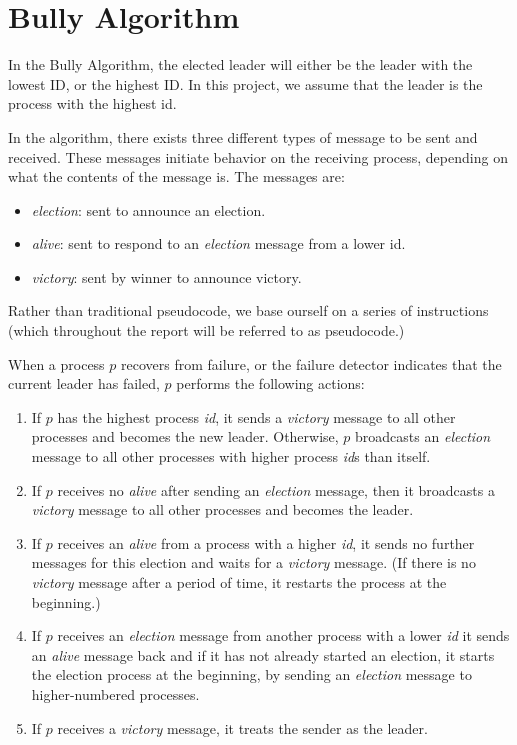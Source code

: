 \documentclass{report}
\begin{document}
\section{Bully Algorithm}

In the Bully Algorithm, the elected leader will either be the leader with the lowest ID, or the highest ID. In this project, we assume that the leader is the process with the highest id.

In the algorithm, there exists three different types of message to be sent and received. These messages initiate behavior on the receiving process, depending on what the contents of the message is. The messages are:
\begin{itemize}
  \item \textit{election}: sent to announce an election.
  \item \textit{alive}: sent to respond to an \textit{election} message from a lower id.
  \item \textit{victory}: sent by winner to announce victory.
\end{itemize}

Rather than traditional pseudocode, we base ourself on a series of instructions (which throughout the report will be referred to as pseudocode.)

When a process $p$ recovers from failure, or the failure detector indicates that the current leader has failed, $p$ performs the following actions:

\begin{enumerate}
\item If $p$ has the highest process \textit{id}, it sends a \textit{victory} message to all other processes and becomes the new leader. Otherwise, $p$ broadcasts an \textit{election} message to all other processes with higher process \textit{id}s than itself.
\item If $p$ receives no \textit{alive} after sending an \textit{election} message, then it broadcasts a \textit{victory} message to all other processes and becomes the leader.
\item If $p$ receives an \textit{alive} from a process with a higher \textit{id}, it sends no further messages for this election and waits for a \textit{victory} message. (If there is no \textit{victory} message after a period of time, it restarts the process at the beginning.)
\item If $p$ receives an \textit{election} message from another process with a lower \textit{id} it sends an \textit{alive} message back and if it has not already started an election, it starts the election process at the beginning, by sending an \textit{election} message to higher-numbered processes.
\item If $p$ receives a \textit{victory} message, it treats the sender as the leader.
\end{enumerate}
\end{document}
